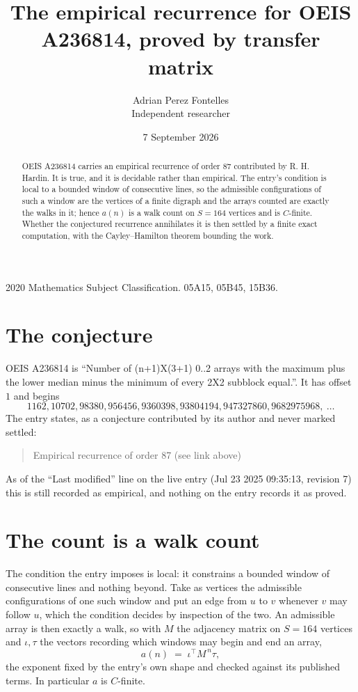 \documentclass[11pt,a4paper]{article}
\title{The empirical recurrence for OEIS A236814, proved by transfer matrix}
\author{Adrian Perez Fontelles\\ \small Independent researcher}
\date{7 September 2026}
\theoremstyle{plain}
\theoremstyle{definition}
\begin{document}
\maketitle

\begin{abstract}
OEIS A236814 carries an empirical recurrence of order $87$ contributed by R. H. Hardin. It is
true, and it is decidable rather than empirical. The entry's condition is local to a bounded window of consecutive lines, so
the admissible configurations of such a window are the vertices of a finite digraph and the
arrays counted are exactly the walks in it; hence $a(n)$ is a walk count on $S=164$ vertices
and is $C$-finite. Whether the conjectured recurrence annihilates it is then settled by a
finite exact computation, with the Cayley--Hamilton theorem bounding the work.
\end{abstract}

\noindent\small 2020 Mathematics Subject Classification. 05A15, 05B45, 15B36.\normalsize

\section{The conjecture}

OEIS A236814 is ``Number of (n+1)X(3+1) 0..2 arrays with the maximum plus the lower median minus the minimum of every 2X2 subblock equal.''. It has offset $1$ and begins
\[
1162, 10702, 98380, 956456, 9360398, 93804194, 947327860, 9682975968,\ \dots
\]
The entry states, as a conjecture contributed by its author and never marked settled:
\begin{quote}
Empirical recurrence of order 87 (see link above)
\end{quote}
As of the ``Last modified'' line on the live entry (Jul 23 2025 09:35:13, revision 7) this is still
recorded as empirical, and nothing on the entry records it as proved.

\section{The count is a walk count}

The condition the entry imposes is local: it constrains a bounded window of consecutive lines and nothing beyond. Take as
vertices the admissible configurations of one such window and put an edge from $u$ to $v$
whenever $v$ may follow $u$, which the condition decides by inspection of the two. An
admissible array is then exactly a walk, so with $M$ the adjacency matrix on $S=164$ vertices
and $\iota,\tau$ the vectors recording which windows may begin and end an array,
\[
a(n)\;=\;\iota^{\!\top}M^{\,n}\tau ,
\]
the exponent fixed by the entry's own shape and checked against its published terms. In
particular $a$ is $C$-finite.
\end{document}
